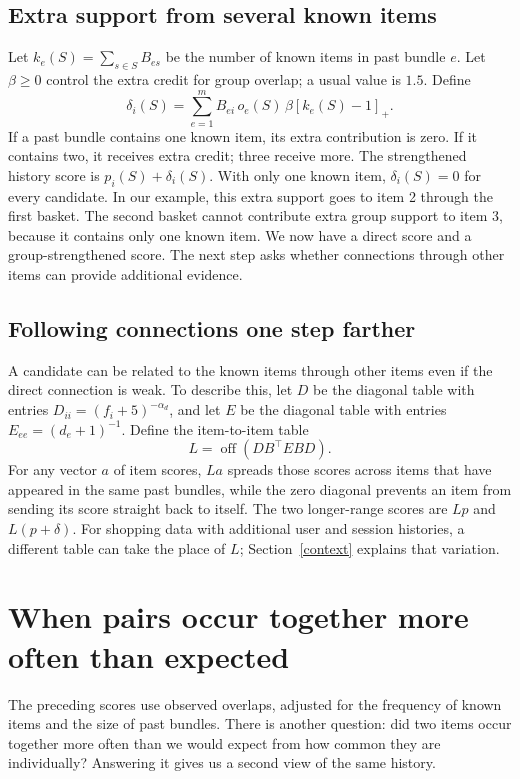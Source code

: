 \documentclass[11pt,a4paper]{article}
\numberwithin{equation}{section}
\begin{document}
\subsection{Extra support from several known items}
Let $k_e(S)=\sum_{s\in S}B_{es}$ be the number of known items in past bundle $e$.
Let $\beta\ge0$ control the extra credit for group overlap; a usual value is $1.5$.
Define
\begin{equation}\label{surplus}
 \delta_i(S)=\sum_{e=1}^{m}B_{ei}\,o_e(S)\,\beta[k_e(S)-1]_+.
\end{equation}
If a past bundle contains one known item, its extra contribution is zero. If it contains
two, it receives extra credit; three receive more. The strengthened history score is
$p_i(S)+\delta_i(S)$. With only one known item, $\delta_i(S)=0$ for every candidate.
In our example, this extra support goes to item 2 through the first basket. The second
basket cannot contribute extra group support to item 3, because it contains only one known
item. We now have a direct score and a group-strengthened score. The next step asks whether
connections through other items can provide additional evidence.

\subsection{Following connections one step farther}
A candidate can be related to the known items through other items even if the direct
connection is weak. To describe this, let $D$ be the diagonal table with entries
$D_{ii}=(f_i+5)^{-\alpha_d}$, and let $E$ be the diagonal table with entries
$E_{ee}=(d_e+1)^{-1}$. Define the item-to-item table
\begin{equation}\label{L}
 L=\operatorname{off}(DB^\top EBD).
\end{equation}
For any vector $a$ of item scores, $La$ spreads those scores across items that have appeared
in the same past bundles, while the zero diagonal prevents an item from sending its score
straight back to itself. The two longer-range scores are $Lp$ and $L(p+\delta)$.
For shopping data with additional user and session histories, a different table can take
the place of $L$; Section~\ref{context} explains that variation.

\section{When pairs occur together more often than expected}
The preceding scores use observed overlaps, adjusted for the frequency of known items and
the size of past bundles. There is another question: did two items occur together more often
than we would expect from how common they are individually? Answering it gives us a
second view of the same history.
\end{document}
